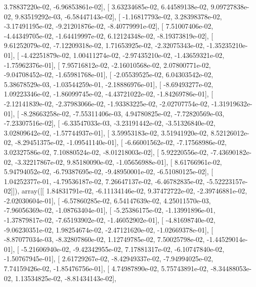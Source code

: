 \documentclass{article}
\begin{document}
          3.78837220e-02,  -6.96853861e-02],
       [  3.63234685e-02,   6.44589138e-02,   9.09727838e-02,
          9.83519292e-03,  -6.58447143e-02],
       [ -1.16817793e-02,   3.28398378e-02,  -3.17491195e-02,
         -9.21201876e-02,  -8.40779991e-02],
       [  7.51007406e-02,  -4.44349705e-02,  -1.64419997e-02,
          6.12124348e-02,  -8.19373819e-02],
       [  9.61252079e-02,  -7.12209318e-02,   1.71653925e-02,
         -2.32075343e-02,  -1.35235210e-01],
       [ -4.42251879e-02,   1.00411274e-02,  -2.97435210e-02,
         -1.43659321e-02,  -1.75962376e-01],
       [  7.95716812e-02,  -2.16010568e-02,   2.07800771e-02,
         -9.04708452e-02,  -1.65981768e-01],
       [ -2.05539525e-02,   6.04303542e-02,   5.38678529e-03,
         -1.03544259e-01,  -2.18886976e-01],
       [ -8.69493277e-02,   1.09223346e-02,  -1.86099745e-02,
         -4.43721022e-02,  -1.84269786e-01],
       [ -2.12141839e-02,  -2.37983066e-02,  -1.93383225e-02,
         -2.02707754e-02,  -1.31919632e-01],
       [ -8.28663258e-02,  -7.55311406e-03,   4.94780825e-02,
         -7.72820569e-03,  -7.23307516e-02],
       [ -6.33547033e-03,  -3.23191442e-02,  -3.51326840e-02,
          3.02809642e-02,  -1.57744937e-01],
       [  3.59953183e-02,   3.51941920e-02,   8.52126012e-02,
         -8.29451375e-02,  -1.09541140e-01],
       [ -6.66001562e-02,  -7.17568986e-02,   3.02327586e-02,
          7.10880524e-02,  -8.01218003e-02],
       [  5.92220556e-02,  -7.43690182e-02,  -3.32217867e-02,
          9.85180090e-02,  -1.05656988e-01],
       [  8.61766961e-02,   5.94794052e-02,  -6.79387695e-02,
         -9.48950001e-02,  -6.51080125e-02],
       [  1.04252377e-01,  -4.79536187e-02,   7.26647137e-02,
         -6.46782835e-02,  -5.52223157e-02]]), array([[  1.84831791e-02,  -6.11134146e-02,   9.37472722e-02,
         -2.39746881e-02,  -2.02030604e-01],
       [ -6.57860285e-02,   6.54147639e-02,   4.25011570e-03,
         -7.96056369e-02,  -1.08763404e-01],
       [ -5.25386175e-02,  -1.13991896e-01,  -1.37879817e-02,
         -7.65193902e-02,  -1.46052902e-01],
       [ -4.81698740e-02,  -9.06230351e-02,   1.98254674e-02,
         -2.47121620e-02,  -1.02669378e-01],
       [ -8.87077034e-03,  -8.32807860e-02,   1.12749785e-02,
          7.50025798e-02,  -1.44529014e-01],
       [ -5.21606940e-02,  -9.42342955e-02,   7.17881317e-02,
         -6.10747840e-02,  -1.50767945e-01],
       [  2.61729267e-02,  -8.42949337e-02,  -7.94994025e-02,
          7.74159426e-02,  -1.85476756e-01],
       [  4.74987890e-02,   5.75743891e-02,  -8.34488053e-02,
          1.13534825e-02,  -8.81434143e-02],
\end{document}
